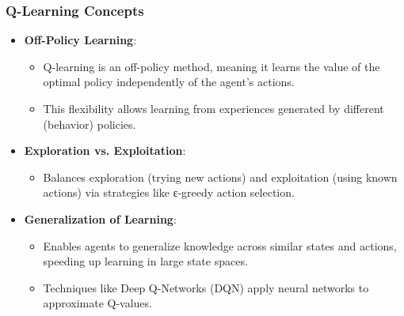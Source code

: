 \documentclass[aspectratio=169]{beamer}
\begin{document}
\begin{frame}
    \frametitle{Q-Learning Concepts}
    \begin{itemize}
        \item \textbf{Off-Policy Learning}:
        \begin{itemize}
            \item Q-learning is an off-policy method, meaning it learns the value of the optimal policy independently of the agent's actions.
            \item This flexibility allows learning from experiences generated by different (behavior) policies.
        \end{itemize}
        
        \item \textbf{Exploration vs. Exploitation}:
        \begin{itemize}
            \item Balances exploration (trying new actions) and exploitation (using known actions) via strategies like ε-greedy action selection.
        \end{itemize}
        
        \item \textbf{Generalization of Learning}:
        \begin{itemize}
            \item Enables agents to generalize knowledge across similar states and actions, speeding up learning in large state spaces.
            \item Techniques like Deep Q-Networks (DQN) apply neural networks to approximate Q-values.
        \end{itemize}
    \end{itemize}
\end{frame}
\end{document}
